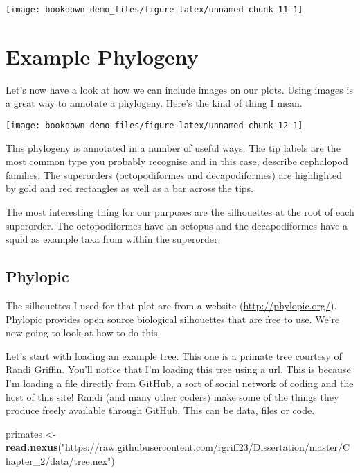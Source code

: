 \documentclass[]{book}
\newenvironment{Shaded}{\begin{snugshade}}{\end{snugshade}}
\newcommand{\KeywordTok}[1]{\textcolor[rgb]{0.13,0.29,0.53}{\textbf{#1}}}
\newcommand{\StringTok}[1]{\textcolor[rgb]{0.31,0.60,0.02}{#1}}
\newcommand{\NormalTok}[1]{#1}
\begin{document}
\begin{center}\texttt{[image: bookdown-demo\_files/figure-latex/unnamed-chunk-11-1]} \end{center}

\section{Example Phylogeny}\label{example-phylogeny}

Let's now have a look at how we can include images on our plots. Using
images is a great way to annotate a phylogeny. Here's the kind of thing
I mean.

\begin{center}\texttt{[image: bookdown-demo\_files/figure-latex/unnamed-chunk-12-1]} \end{center}

This phylogeny is annotated in a number of useful ways. The tip labels
are the most common type you probably recognise and in this case,
describe cephalopod families. The superorders (octopodiformes and
decapodiformes) are highlighted by gold and red rectangles as well as a
bar across the tips.

The most interesting thing for our purposes are the silhouettes at the
root of each superorder. The octopodiformes have an octopus and the
decapodiformes have a squid as example taxa from within the superorder.

\subsection{Phylopic}\label{phylopic}

The silhouettes I used for that plot are from a website
(\url{http://phylopic.org/}). Phylopic provides open source biological
silhouettes that are free to use. We're now going to look at how to do
this.

Let's start with loading an example tree. This one is a primate tree
courtesy of Randi Griffin. You'll notice that I'm loading this tree
using a url. This is because I'm loading a file directly from GitHub, a
sort of social network of coding and the host of this site! Randi (and
many other coders) make some of the things they produce freely available
through GitHub. This can be data, files or code.

\begin{Shaded}
\begin{Highlighting}[]
\NormalTok{primates <-}\StringTok{ }\KeywordTok{read.nexus}\NormalTok{(}\StringTok{"https://raw.githubusercontent.com/rgriff23/Dissertation/master/Chapter_2/data/tree.nex"}\NormalTok{)}
\end{Highlighting}
\end{Shaded}
\end{document}
